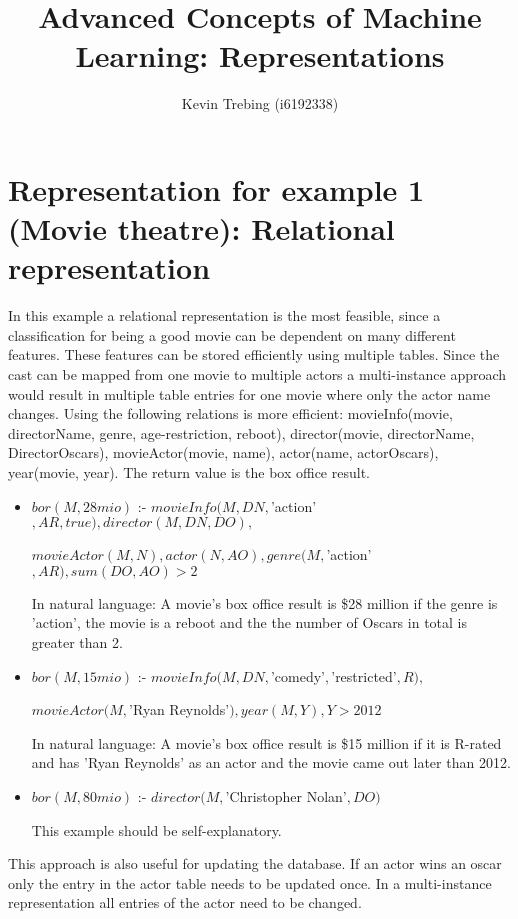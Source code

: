 \documentclass[a4paper]{article}
\title{Advanced Concepts of Machine Learning: Representations}
\author{Kevin Trebing (i6192338)}
\begin{document}
\maketitle

\section{Representation for example 1 (Movie theatre): Relational representation}
In this example a relational representation is the most feasible, since a classification for being a good movie can be dependent on many different features. These features can be stored efficiently using multiple tables. Since the cast can be mapped from one movie to multiple actors a multi-instance approach would result in multiple table entries for one movie where only the actor name changes. Using the following relations is more efficient:
movieInfo(movie, directorName, genre, age-restriction, reboot), director(movie, directorName, DirectorOscars), movieActor(movie, name), actor(name, actorOscars), year(movie, year). The return value is the box office result.

\begin{itemize}
\item $bor(M, 28mio)$ :- $movieInfo(M, DN, $'action'$, AR, true), director(M, DN, DO), $

\indent\indent\indent\indent$movieActor(M, N), actor(N, AO), genre(M, $'action'$, AR), sum(DO, AO) > 2$

In natural language: A movie's box office result is \$28 million if the genre is 'action', the movie is a reboot and the the number of Oscars in total is greater than 2.

\item $bor(M, 15mio)$ :- $movieInfo(M, DN, $'comedy'$, $'restricted'$, R), $

 
\indent\indent\indent\indent$movieActor(M, $'Ryan Reynolds'$), year(M, Y), Y > 2012$

In natural language: A movie's box office result is \$15 million if it is R-rated and has 'Ryan Reynolds' as an actor and the movie came out later than 2012.

\item $bor(M, 80mio)$ :- $director(M, $'Christopher Nolan'$, DO)$

This example should be self-explanatory.
\end{itemize}

This approach is also useful for updating the database. If an actor wins an oscar only the entry in the actor table needs to be updated once. In a multi-instance representation all entries of the actor need to be changed.
\end{document}
